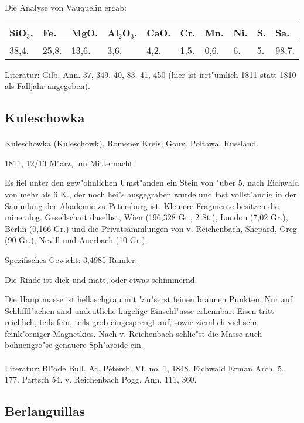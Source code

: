 \documentclass[a4paper, 11pt, oneside]{article}
\begin{document}
Die Analyse von Vauquelin ergab:
\begin{table}[!ht]
    \centering
    \begin{tabular}{l l l l l l l l l l}
        SiO$_{3}$. & Fe. & MgO. & Al$_{2}$O$_{3}$. & CaO. & Cr. & Mn. & Ni. & S. & Sa. \\ \hline
        38,4. & 25,8. & 13,6. & 3,6. & 4,2. & 1,5. & 0,6. & 6. & 5. & 98,7. \\
    \end{tabular}
\end{table}

\footnotesize
Literatur: Gilb. Ann. 37, 349. 40, 83. 41, 450 (hier ist irrt"umlich 1811 statt 1810 als Falljahr angegeben).
\subsection{Kuleschowka}
\normalsize
\paragraph{}
Kuleschowka (Kuleschowk), Romener Kreis, Gouv. Poltawa. Russland.

1811, 12/13 M"arz, um Mitternacht.

Es fiel unter den gew"ohnlichen Umst"anden ein Stein von "uber 5, nach Eichwald von mehr als 6 K., der noch hei"s ausgegraben wurde und fast vollst"andig in der Sammlung der Akademie zu Petersburg ist. Kleinere Fragmente besitzen die mineralog. Gesellschaft daselbst, Wien (196,328 Gr., 2 St.), London (7,02 Gr.), Berlin (0,166 Gr.) und die Privatsammlungen von v. Reichenbach, Shepard, Greg (90 Gr.), Nevill und Auerbach (10 Gr.).

Spezifisches Gewicht: 3,4985 Rumler.

Die Rinde ist dick und matt, oder etwas schimmernd.

Die Hauptmasse ist hellaschgrau mit "au"serst feinen braunen Punkten. Nur auf Schlifffl"achen sind undeutliche kugelige Einschl"usse erkennbar. Eisen tritt reichlich, teils fein, teils grob eingesprengt auf, sowie ziemlich viel sehr feink"orniger Magnetkies. Nach v. Reichenbach schlie"st die Masse auch bohnengro"se genauere Sph"aroide ein.
\footnotesize
\paragraph{}
Literatur: Bl"ode Bull. Ac. Pétersb. VI. no. 1, 1848. Eichwald Erman Arch. 5, 177. Partsch 54. v. Reichenbach Pogg. Ann. 111, 360.
\subsection{Berlanguillas}
\normalsize
\end{document}
